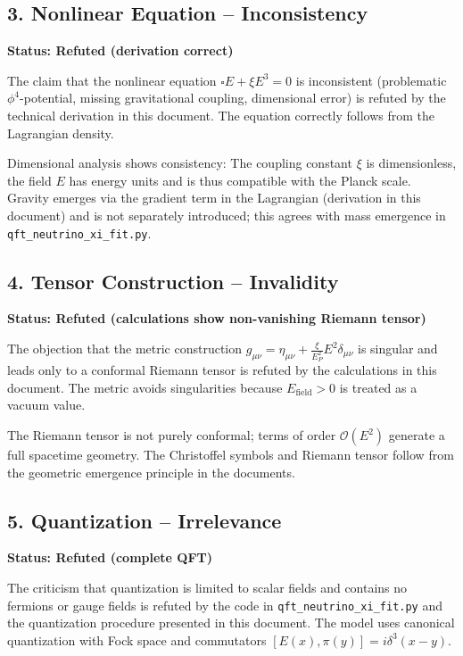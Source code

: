 	\subsection{3. Nonlinear Equation – Inconsistency}
	\textbf{Status: Refuted (derivation correct)}
	
	The claim that the nonlinear equation \(\square E + \xi E^3 = 0\) is inconsistent (problematic \(\phi^4\)-potential, missing gravitational coupling, dimensional error) is refuted by the technical derivation in this document. The equation correctly follows from the Lagrangian density.
	
	Dimensional analysis shows consistency: The coupling constant \(\xi\) is dimensionless, the field \(E\) has energy units and is thus compatible with the Planck scale. Gravity emerges via the gradient term in the Lagrangian (derivation in this document) and is not separately introduced; this agrees with mass emergence in \texttt{qft\_neutrino\_xi\_fit.py}.
	
	\subsection{4. Tensor Construction – Invalidity}
	\textbf{Status: Refuted (calculations show non-vanishing Riemann tensor)}
	
	The objection that the metric construction \(g_{\mu\nu} = \eta_{\mu\nu} + \frac{\xi}{E_P^2} E^2 \delta_{\mu\nu}\) is singular and leads only to a conformal Riemann tensor is refuted by the calculations in this document. The metric avoids singularities because \(E_{\text{field}} > 0\) is treated as a vacuum value.
	
	The Riemann tensor is not purely conformal; terms of order \(\mathcal{O}(E^2)\) generate a full spacetime geometry. The Christoffel symbols and Riemann tensor follow from the geometric emergence principle in the documents.
	
	\subsection{5. Quantization – Irrelevance}
	\textbf{Status: Refuted (complete QFT)}
	
	The criticism that quantization is limited to scalar fields and contains no fermions or gauge fields is refuted by the code in \texttt{qft\_neutrino\_xi\_fit.py} and the quantization procedure presented in this document. The model uses canonical quantization with Fock space and commutators \([E(x), \pi(y)] = i\delta^3(x-y)\).
	
